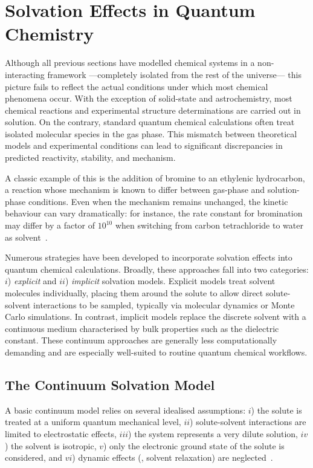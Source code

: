\section{Solvation Effects in Quantum Chemistry}

Although all previous sections have modelled chemical systems in a
non-interacting framework ---completely isolated from the rest of the
universe--- this picture fails to reflect the actual conditions under which
most chemical phenomena occur. With the exception of solid-state and
astrochemistry, most chemical reactions and experimental structure
determinations are carried out in solution. On the contrary, standard quantum
chemical calculations often treat isolated molecular species in the gas phase.
This mismatch between theoretical models and experimental conditions can lead
to significant discrepancies in predicted reactivity, stability, and mechanism.

A classic example of this is the addition of bromine to an ethylenic
hydrocarbon, a reaction whose mechanism is known to differ between gas-phase
and solution-phase conditions. Even when the mechanism remains unchanged, the
kinetic behaviour can vary dramatically: for instance, the rate constant for
bromination may differ by a factor of $10^{10}$ when switching from carbon
tetrachloride to water as solvent~\cite{Monard2017, Reichardt1979}.

Numerous strategies have been developed to incorporate solvation effects into
quantum chemical calculations. Broadly, these approaches fall into two
categories: $i$) \emph{explicit} and $ii$) \emph{implicit} solvation models. Explicit
models treat solvent molecules individually, placing them around the solute to
allow direct solute-solvent interactions to be sampled, typically via molecular
dynamics or Monte Carlo simulations. In contrast, implicit models replace the
discrete solvent with a continuous medium characterised by bulk
properties such as the dielectric constant. These continuum approaches are
generally less computationally demanding and are especially well-suited to
routine quantum chemical workflows.

\newpage
\subsection{The Continuum Solvation Model}

A basic continuum model relies on several idealised assumptions:
$i$) the solute is treated at a uniform quantum mechanical level,
$ii$) solute-solvent interactions are limited to electrostatic effects,
$iii$) the system represents a very dilute solution,
$iv$) the solvent is isotropic,
$v$) only the electronic ground state of the solute is considered, and
$vi$) dynamic effects (\eg, solvent relaxation) are neglected~\cite{Tomasi2005}.


